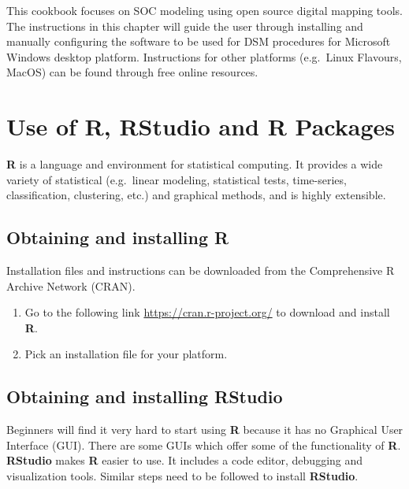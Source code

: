 \documentclass[
  10pt,
  b5paper,
  oneside]{book}
\providecommand{\tightlist}{%
  \setlength{\itemsep}{0pt}\setlength{\parskip}{0pt}}
\begin{document}
This cookbook focuses on SOC modeling using open source digital mapping tools. The instructions in this chapter will guide the user through installing and manually configuring the software to be used for DSM procedures for Microsoft Windows desktop platform. Instructions for other platforms (e.g.~Linux Flavours, MacOS) can be found through free online resources.

\hypertarget{use-of-r-rstudio-and-r-packages}{%
\section{Use of R, RStudio and R Packages}\label{use-of-r-rstudio-and-r-packages}}

\textbf{R} is a language and environment for statistical computing. It provides a wide variety of statistical (e.g.~linear modeling, statistical tests, time-series, classification, clustering, etc.) and graphical methods, and is highly extensible.

\hypertarget{obtaining-and-installing-r}{%
\subsection{Obtaining and installing R}\label{obtaining-and-installing-r}}

Installation files and instructions can be downloaded from the Comprehensive R Archive Network (CRAN).

\begin{enumerate}
\def\labelenumi{\arabic{enumi}.}
\tightlist
\item
  Go to the following link \url{https://cran.r-project.org/} to download and install \textbf{R}.
\item
  Pick an installation file for your platform.
\end{enumerate}

\hypertarget{obtaining-and-installing-rstudio}{%
\subsection{Obtaining and installing RStudio}\label{obtaining-and-installing-rstudio}}

Beginners will find it very hard to start using \textbf{R} because it has no Graphical User Interface (GUI). There are some GUIs which offer some of the functionality of \textbf{R}. \textbf{RStudio} makes \textbf{R} easier to use. It includes a code editor, debugging and visualization tools. Similar steps need to be followed to install \textbf{RStudio}.
\end{document}
